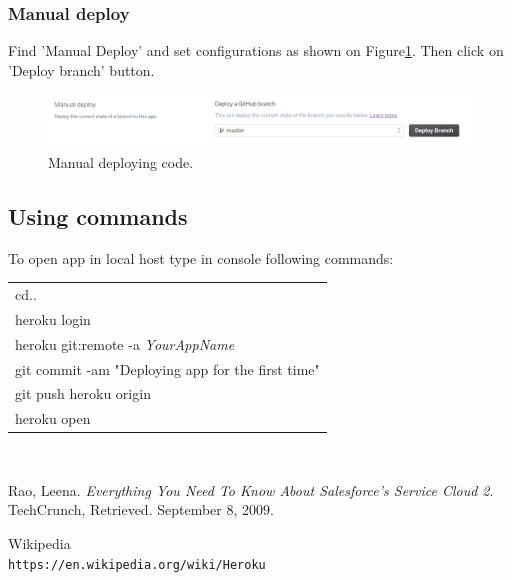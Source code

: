 \documentclass[12pt,a4paper]{article}
\begin{document}
\subsubsection{Manual deploy}
 Find 'Manual Deploy' and set configurations as shown on Figure\ref{fig:dep}. Then click on 'Deploy branch' button.

\begin{figure}[H]
	\centering
	\includegraphics[width=1\textwidth]{images/manual.PNG}
	\caption{Manual deploying code.}
	\label{fig:dep}
\end{figure}

\subsection{Using commands}
To open app in local host type in console following commands:\\
\begin{tabular}{|l|}
	\hline
	cd..\\
	heroku login\\
	heroku git:remote -a \textit{YourAppName}\\
	git commit -am "Deploying app for the first time"\\
	git push heroku origin\\
	heroku open\\
	\hline
\end{tabular}\\

\begin{thebibliography}{bib}
	 Rao, Leena. 
	\textit{Everything You Need To Know About Salesforce's Service Cloud 2}. 
	TechCrunch, Retrieved. September 8, 2009.
	 
	
	Wikipedia
	\\\texttt{https://en.wikipedia.org/wiki/Heroku}
	
\end{thebibliography}
\end{document}
